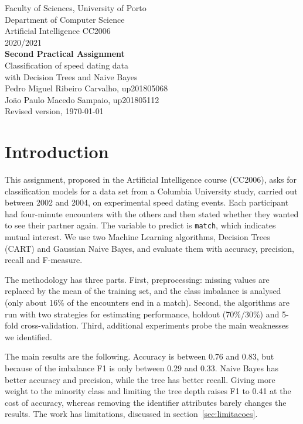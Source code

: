 \documentclass[12pt,a4paper]{article}
\newcommand{\code}[1]{\texttt{#1}}
\begin{document}
\begin{titlepage}
  \thispagestyle{empty}
  \centering
  \vspace*{1cm}
  {\large Faculty of Sciences, University of Porto\\ Department of Computer Science}\\[2.5cm]
  {\Large Artificial Intelligence CC2006}\\[0.4cm]
  {\large 2020/2021}\\[2cm]
  {\Huge\bfseries Second Practical Assignment}\\[0.8cm]
  {\LARGE Classification of speed dating data\\ with Decision Trees and Naive Bayes}\\[3cm]
  {\large
  Pedro Miguel Ribeiro Carvalho, up201805068\\[0.3em]
  João Paulo Macedo Sampaio, up201805112}\\[\fill]
  Revised version, \today
\end{titlepage}

\tableofcontents
\listoffigures
\listoftables

\clearpage
\section{Introduction}

This assignment, proposed in the Artificial Intelligence course (CC2006), asks for classification models for a data set from a Columbia University study, carried out between 2002 and 2004, on experimental speed dating events. Each participant had four-minute encounters with the others and then stated whether they wanted to see their partner again. The variable to predict is \code{match}, which indicates mutual interest. We use two Machine Learning algorithms, Decision Trees (CART) and Gaussian Naive Bayes, and evaluate them with accuracy, precision, recall and F-measure.

The methodology has three parts. First, preprocessing: missing values are replaced by the mean of the training set, and the class imbalance is analysed (only about 16\% of the encounters end in a match). Second, the algorithms are run with two strategies for estimating performance, holdout (70\%/30\%) and 5-fold cross-validation. Third, additional experiments probe the main weaknesses we identified.

The main results are the following. Accuracy is between 0.76 and 0.83, but because of the imbalance F1 is only between 0.29 and 0.33. Naive Bayes has better accuracy and precision, while the tree has better recall. Giving more weight to the minority class and limiting the tree depth raises F1 to 0.41 at the cost of accuracy, whereas removing the identifier attributes barely changes the results. The work has limitations, discussed in section~\ref{sec:limitacoes}.
\end{document}
